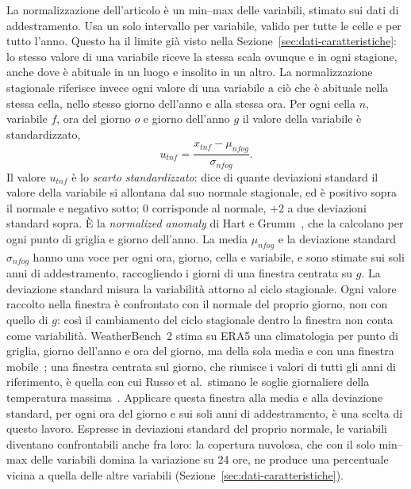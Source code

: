 La normalizzazione dell'articolo è un min--max delle variabili, stimato sui dati di addestramento. Usa un solo intervallo per variabile, valido per tutte le celle e per tutto l'anno. Questo ha il limite già visto nella Sezione~\ref{sec:dati-caratteristiche}: lo stesso valore di una variabile riceve la stessa scala ovunque e in ogni stagione, anche dove è abituale in un luogo e insolito in un altro. La normalizzazione stagionale riferisce invece ogni valore di una variabile a ciò che è abituale nella stessa cella, nello stesso giorno dell'anno e alla stessa ora. Per ogni cella $n$, variabile $f$, ora del giorno $o$ e giorno dell'anno $g$ il valore della variabile è standardizzato,
\begin{equation}
u_{tnf}=\frac{x_{tnf}-\mu_{nfog}}{\sigma_{nfog}}.
\end{equation}
Il valore $u_{tnf}$ è lo \emph{scarto standardizzato}: dice di quante deviazioni standard il valore della variabile si allontana dal suo normale stagionale, ed è positivo sopra il normale e negativo sotto; 0 corrisponde al normale, $+2$ a due deviazioni standard sopra. È la \emph{normalized anomaly} di Hart e Grumm~\cite{hart2001anomalies}, che la calcolano per ogni punto di griglia e giorno dell'anno. La media $\mu_{nfog}$ e la deviazione standard $\sigma_{nfog}$ hanno una voce per ogni ora, giorno, cella e variabile, e sono stimate sui soli anni di addestramento, raccogliendo i giorni di una finestra centrata su $g$. La deviazione standard misura la variabilità attorno al ciclo stagionale. Ogni valore raccolto nella finestra è confrontato con il normale del proprio giorno, non con quello di $g$: così il cambiamento del ciclo stagionale dentro la finestra non conta come variabilità. WeatherBench~2 stima su ERA5 una climatologia per punto di griglia, giorno dell'anno e ora del giorno, ma della sola media e con una finestra mobile~\cite{rasp2024weatherbench2}; una finestra centrata sul giorno, che riunisce i valori di tutti gli anni di riferimento, è quella con cui Russo et al.\ stimano le soglie giornaliere della temperatura massima~\cite{russo2015heatwaves}. Applicare questa finestra alla media e alla deviazione standard, per ogni ora del giorno e sui soli anni di addestramento, è una scelta di questo lavoro. Espresse in deviazioni standard del proprio normale, le variabili diventano confrontabili anche fra loro: la copertura nuvolosa, che con il solo min--max delle variabili domina la variazione su 24 ore, ne produce una percentuale vicina a quella delle altre variabili (Sezione~\ref{sec:dati-caratteristiche}).

